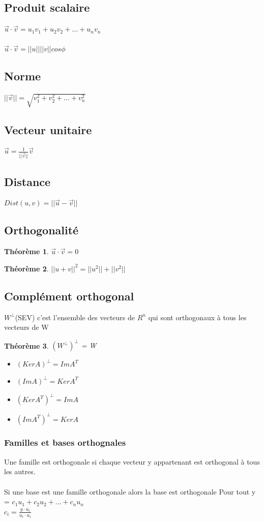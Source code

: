 \documentclass{article}
\newtheorem{theorem}{Théorème}[section]
\begin{document}
\subsection{Produit scalaire}
$\overrightarrow{u}\cdot\overrightarrow{v} = u_1v_1 + u_2v_2 + ... + u_nv_n$\\\\
$\overrightarrow{u}\cdot\overrightarrow{v} = ||u||||v||cos\phi$
\subsection{Norme}
$||\overrightarrow{v}|| = \sqrt{v_1^2 + v_2^2 + ... + v_n^2}$
\subsection{Vecteur unitaire}
$\overrightarrow{u} = \frac{1}{||\overrightarrow{v}||}\overrightarrow{v}$
\subsection{Distance}
$Dist(u,v) = ||\overrightarrow{u} - \overrightarrow{v}||$
\subsection{Orthogonalité}
\begin{theorem}
    $\overrightarrow{u} \cdot \overrightarrow{v} = 0$
\end{theorem}
\begin{theorem}
    $||u + v||^2 = ||u^2|| + ||v^2||$
\end{theorem}
\subsection{Complément orthogonal}
$W^{\perp}$(SEV) c'est l'ensemble des vecteurs de $R^n$ qui sont orthogonaux à tous les vecteurs de W
\begin{theorem}
    $(W^{\perp})^{\perp}$ = W
\end{theorem}
\begin{itemize}
    \item $(Ker A)^{\perp} = ImA^T$
    \item $(ImA)^{\perp} = KerA^T$
    \item $(KerA^T)^{\perp} = ImA$
    \item $(ImA^T)^{\perp} = KerA  $
\end{itemize}
\subsubsection{Familles et bases orthognales}
Une famille est orthogonale si chaque vecteur y appartenant est orthogonal à tous les autres. \\\\
Si une base est une famille orthogonale alors la base est orthogonale
\newline \newline 
Pour tout y = $c_1u_1 + c_2u_2 + ... + c_nu_n$ \\
$c_i = \frac{y \cdot u_i}{u_i \cdot u_i}$
\end{document}
